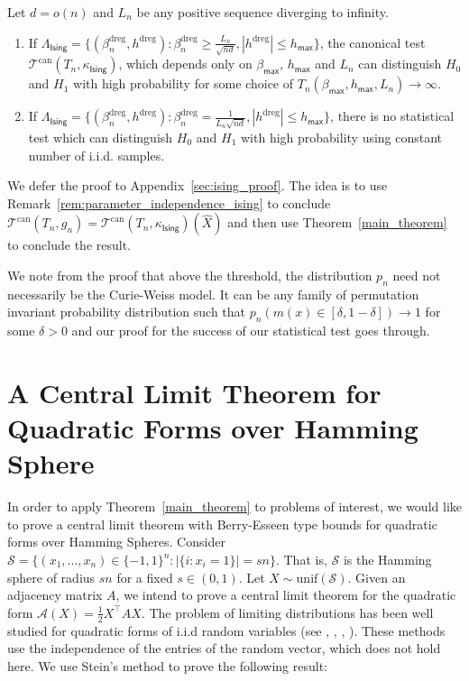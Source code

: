 \documentclass[final,12pt]{colt2018}
\begin{document}
\begin{theorem} \label{thm:ising_threshold}
Let $d = o(n)$ and $L_n$ be any positive sequence diverging to infinity.
\begin{enumerate}
\item If $\Lambda_{\mathsf{Ising}} = \{(\beta^{\mathrm{dreg}}_n,h^{\mathrm{dreg}}) : \beta^{\mathrm{dreg}}_n \geq \frac{L_n}{\sqrt{nd}}, |h^{\mathrm{dreg}}| \leq h_{\mathsf{\max}}\}$, the canonical test $\mathcal{T}^{\mathrm{can}}(T_n,\kappa_{\mathsf{Ising}})$,  which depends only on $\beta_{\mathsf{max}}$, $h_{\mathsf{max}}$ and $L_n$ can distinguish $H_0$ and $H_1$ with high probability for some choice of $T_n(\beta_{\mathsf{max}},h_{\mathsf{max}},L_n) \to \infty$.
\item If $\Lambda_{\mathsf{Ising}} = \{(\beta^{\mathrm{dreg}}_n,h^{\mathrm{dreg}}) : \beta^{\mathrm{dreg}}_n = \frac{1}{L_n\sqrt{nd}},|h^{\mathrm{dreg}}| \leq h_{\mathsf{\max}}\} $, there is no statistical test which can distinguish $H_0$ and $H_1 $ with high probability using constant number of i.i.d. samples.
\end{enumerate}
\end{theorem} 
 We defer the proof to Appendix~\ref{sec:ising_proof}. The idea is to use Remark~\ref{rem:parameter_independence_ising} to conclude $\mathcal{T}^{\mathrm{can}}(T_n,g_n) = \mathcal{T}^{\mathrm{can}}(T_n, \kappa_{\mathsf{Ising}})(\hat{X})$ and then use Theorem~\ref{main_theorem} to conclude the result.


We note from the proof that above the threshold, the distribution $p_n$ need not necessarily be the Curie-Weiss model. It can be any family of permutation invariant probability distribution such that $p_n(m(x) \in [\delta,1-\delta]) \to 1$ for some $\delta > 0$ and our proof for the success of our statistical test goes through.  


\section{A Central Limit Theorem for Quadratic Forms over Hamming Sphere}
\label{sec:clt} 
In order to apply Theorem~\ref{main_theorem} to problems of interest, we would like to prove a central limit theorem with Berry-Esseen type bounds for quadratic forms over Hamming Spheres. Consider $\mathcal{S} = \{(x_1,...,x_n) \in \{-1,1\}^n: |\{i: x_i = 1\}| = sn \}$. That is, $\mathcal{S}$ is the Hamming sphere of radius $sn$ for a fixed $s \in (0,1)$. Let $X \sim \mathrm{unif}(\mathcal{S})$. Given an adjacency matrix $A$, we intend to prove a central limit theorem for the quadratic form $\mathcal{A}(X) = \frac{1}{2}X^{\intercal}AX$. The problem of limiting distributions has been well studied for quadratic forms of i.i.d random variables (see \citet{hall1984central}, \citet{rotar1979limit}, \citet{de1987central}, \citet{gotze2002asymptotic}). These methods use the independence of the entries of the random vector, which does not hold here. We use Stein's method to prove the following result: 
\end{document}
